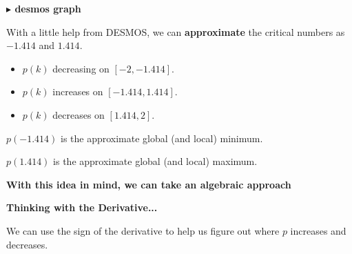 \documentclass{ximera}
\begin{document}
\begin{idea}
\begin{image}
\end{image}






\textbf{\textcolor{blue!55!black}{$\blacktriangleright$ desmos graph}} 
\begin{center}
\end{center}








With a little help from DESMOS, we can \textbf{approximate} the critical numbers as $-1.414$ and $1.414$.



\begin{itemize}
\item  $p(k)$ decreasing on $[-2, -1.414]$.
\item  $p(k)$ increases on $[-1.414, 1.414]$.
\item  $p(k)$ decreases on $[1.414, 2]$.
\end{itemize}




$p(-1.414)$ is the approximate global (and local) minimum. 

$p(1.414)$ is the approximate global (and local) maximum. 


 


\end{idea}



\textbf{\textcolor{red!75!green}{With this idea in mind, we can take an algebraic approach}} 


\textbf{Thinking with the Derivative...}


We can use the sign of the derivative to help us figure out where $p$ increases and decreases. 
\end{document}

